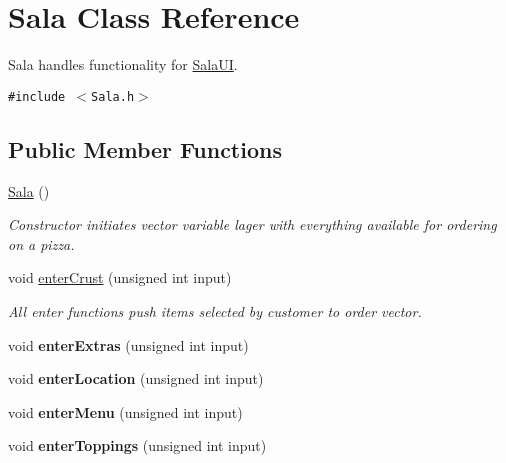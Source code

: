 \hypertarget{class_sala}{
\section{Sala Class Reference}
\label{class_sala}
}
Sala handles functionality for \hyperlink{class_sala_u_i}{Sala\-UI}.  


{\tt \#include $<$Sala.h$>$}

\subsection*{Public Member Functions}
\begin{CompactItemize}
\item 
\hypertarget{class_sala_da283dd136f3f0c2703d0356f49c1e6e}{
\hyperlink{class_sala_da283dd136f3f0c2703d0356f49c1e6e}{Sala} ()}
\label{class_sala_da283dd136f3f0c2703d0356f49c1e6e}

\begin{CompactList}\small\item\em Constructor initiates vector variable lager with everything available for ordering on a pizza. \item\end{CompactList}\item 
void \hyperlink{class_sala_ae3b8375ca0ab5b62e84f86582b8cec3}{enter\-Crust} (unsigned int input)
\begin{CompactList}\small\item\em All enter functions push items selected by customer to order vector. \item\end{CompactList}\item 
\hypertarget{class_sala_f4637151f3f934bdf727685020e956e2}{
void {\bf enter\-Extras} (unsigned int input)}
\label{class_sala_f4637151f3f934bdf727685020e956e2}

\item 
\hypertarget{class_sala_d5b546b927926e2eed280fcdc087135e}{
void {\bf enter\-Location} (unsigned int input)}
\label{class_sala_d5b546b927926e2eed280fcdc087135e}

\item 
\hypertarget{class_sala_1015bfdd699f9dc90a677a87def0b37b}{
void {\bf enter\-Menu} (unsigned int input)}
\label{class_sala_1015bfdd699f9dc90a677a87def0b37b}

\item 
\hypertarget{class_sala_34479ade70e563ba9c7eb9b66df2270e}{
void {\bf enter\-Toppings} (unsigned int input)}
\label{class_sala_34479ade70e563ba9c7eb9b66df2270e}


\end{CompactItemize}
